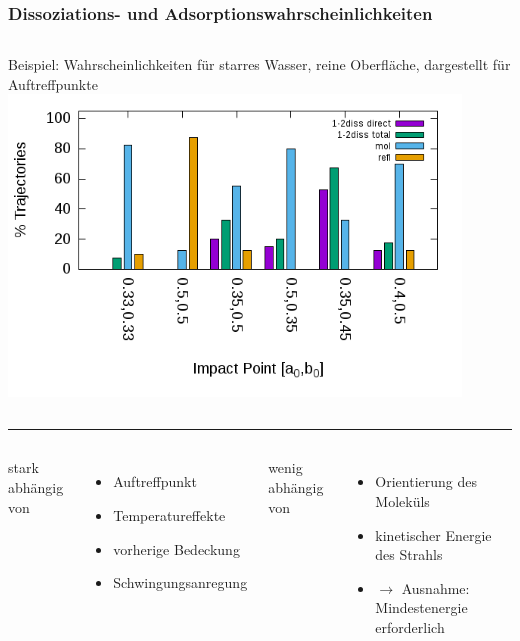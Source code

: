 \documentclass[hyperref={pdfpagelabels=false}]{beamer}
\begin{document}
\begin{frame}
 \frametitle{Dissoziations- und Adsorptionswahrscheinlichkeiten}
 \begin{columns}
Beispiel: Wahrscheinlichkeiten für starres Wasser, reine Oberfläche, dargestellt für Auftreffpunkte	
 \centering
 \includegraphics[width=0.9\textwidth]{figures/impactpoint.png}
\end{columns}
\hrule\pause
 \begin{columns}
  stark abhängig von
  \begin{itemize}
   \item Auftreffpunkt
   \item Temperatureffekte
   \item vorherige Bedeckung
   \item Schwingungsanregung
  \end{itemize}
  \newline wenig abhängig von
  \begin{itemize}
   \item Orientierung des Moleküls
   \item kinetischer Energie des Strahls 
   \item $\rightarrow$ Ausnahme: Mindestenergie erforderlich
  \end{itemize}
 \end{columns}
\\ 
\end{frame}
\end{document}
